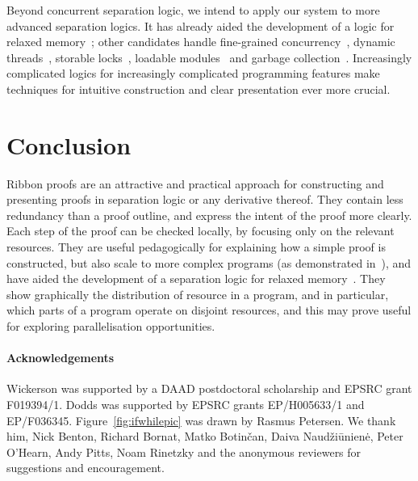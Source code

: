 \documentclass[runningheads,a4paper]{llncs}
\begin{document}
Beyond concurrent separation logic, we intend to apply our system to more advanced separation logics. It has already aided the development of a logic for relaxed memory~\cite{bornat+12}; other candidates handle fine-grained concurrency~\cite{dinsdale-young+10-b,feng09,feng+07-a,vafeiadis+07}, dynamic threads~\cite{dodds+09}, storable locks~\cite{gotsman+07}, loadable modules~\cite{jacobs+11} and garbage collection~\cite{hur+11%
}. Increasingly complicated logics for increasingly complicated programming features make techniques for intuitive construction and clear presentation ever more crucial.

\section{Conclusion}

Ribbon proofs are an attractive and practical approach for constructing and presenting proofs in separation logic or any derivative thereof. They contain less redundancy than a proof outline, and express the intent of the proof more clearly. Each step of the proof can be checked locally, by focusing only on the relevant resources. They are useful pedagogically for explaining how a simple proof is constructed, but also scale to more complex programs (as demonstrated in~\cite{wickerson13}), and have aided the development of a separation logic for relaxed memory~\cite{bornat+12}. They show graphically the distribution of resource in a program, and in particular, which parts of a program operate on disjoint resources, and this may prove useful for exploring parallelisation opportunities.

\paragraph{\bf Acknowledgements} Wickerson was supported by a DAAD postdoctoral scholarship and EPSRC grant F019394/1. Dodds was supported by EPSRC grants EP/H005633/1 and EP/F036345. Figure~\ref{fig:ifwhilepic} was drawn by Rasmus Petersen. We thank him, Nick Benton, Richard Bornat, Matko Botin\v{c}an, Daiva Naud\v{z}i\={u}nien\.{e}, Peter O'Hearn, Andy Pitts, Noam Rinetzky and the anonymous reviewers for suggestions and encouragement.




\end{document}
